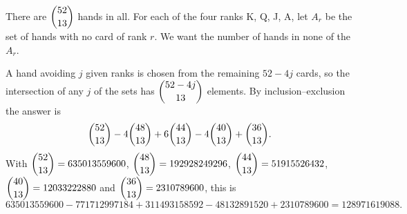 There are $\dbinom{52}{13}$ hands in all. For each of the four ranks K, Q, J, A, let $A_r$ be the set of hands with no card of rank $r$. We want the number of hands in none of the $A_r$.

A hand avoiding $j$ given ranks is chosen from the remaining $52-4j$ cards, so the intersection of any $j$ of the sets has $\dbinom{52-4j}{13}$ elements. By inclusion--exclusion the answer is
\[\dbinom{52}{13}-4\dbinom{48}{13}+6\dbinom{44}{13}-4\dbinom{40}{13}+\dbinom{36}{13}.\]
With $\dbinom{52}{13}=635013559600$, $\dbinom{48}{13}=192928249296$, $\dbinom{44}{13}=51915526432$, $\dbinom{40}{13}=12033222880$ and $\dbinom{36}{13}=2310789600$, this is
\[635013559600-771712997184+311493158592-48132891520+2310789600=\boxed{128971619088}.\]
